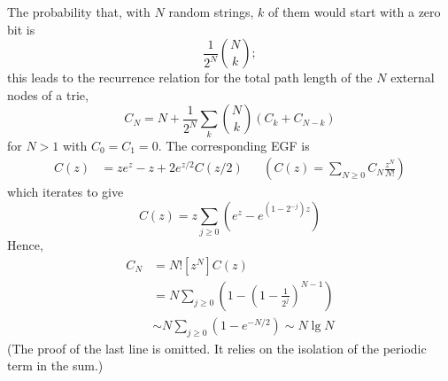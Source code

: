 \documentclass{article}
\begin{document}
The probability that, with $N$ random strings, $k$ of them would start with a
zero bit is \[
  \frac{1}{2^N}\binom{N}{k};
\] this leads to the recurrence relation for the total path length of the $N$
external nodes of a trie, \[
  C_N = N + \frac{1}{2^N}\sum_k \binom{N}{k}(C_k + C_{N - k})
\] for $N > 1$ with $C_0 = C_1 = 0$. The corresponding EGF is
\begin{align*}
  C(z)
  &= ze^z - z + 2e^{z/2}C(z/2)
  &&\left(C(z) = \sum_{N \geq 0} C_N\frac{z^N}{N!}\right)
\end{align*} which iterates to give \[
  C(z) = z \sum_{j \geq 0} \left(e^z - e^{(1 - 2^{-j})z}\right)
\] Hence,
\begin{align*}
  C_N
  &= N![z^N]C(z) \\
  &= N\sum_{j \geq 0} \left(
    1 - \left(1 - \frac{1}{2^j}\right)^{N - 1}
  \right) \\
  &\sim N\sum_{j \geq 0} \left(1 - e^{-N/2}\right) \sim N \lg N
\end{align*}
(The proof of the last line is omitted. It relies on the isolation of the
periodic term in the sum.)
\end{document}

